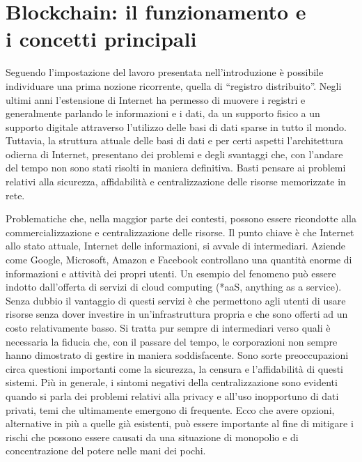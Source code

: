 \chapter{Blockchain: il funzionamento e\\ i concetti principali}
\label{ch:blockchain}

Seguendo l’impostazione del lavoro presentata nell’introduzione è possibile individuare una prima nozione ricorrente, quella di “registro distribuito”. Negli ultimi anni l’estensione di Internet ha permesso di muovere i registri e generalmente parlando le informazioni e i dati, da un supporto fisico a un supporto digitale attraverso l’utilizzo delle basi di dati sparse in tutto il mondo. Tuttavia, la struttura attuale delle basi di dati e per certi aspetti l’architettura odierna di Internet, presentano dei problemi e degli svantaggi che, con l’andare del tempo non sono stati risolti in maniera definitiva. Basti pensare ai problemi relativi alla sicurezza, affidabilità e centralizzazione delle risorse memorizzate in rete.

Problematiche che, nella maggior parte dei contesti, possono essere ricondotte alla commercializzazione e centralizzazione delle risorse. Il punto chiave è che Internet allo stato attuale, Internet delle informazioni, si avvale di intermediari. Aziende come Google, Microsoft, Amazon e Facebook controllano una quantità enorme di informazioni e attività dei propri utenti. Un esempio del fenomeno può essere indotto dall’offerta di servizi di cloud computing (*aaS, anything as a service). Senza dubbio il vantaggio di questi servizi è che permettono agli utenti di usare risorse senza dover investire in un’infrastruttura propria e che sono offerti ad un costo relativamente basso. Si tratta pur sempre di intermediari verso quali è necessaria la fiducia che, con il passare del tempo, le corporazioni non sempre hanno dimostrato di gestire in maniera soddisfacente. Sono sorte preoccupazioni circa questioni importanti come la sicurezza, la censura e l'affidabilità di questi sistemi. Più in generale, i sintomi negativi della centralizzazione sono evidenti quando si parla dei problemi relativi alla privacy e all'uso inopportuno di dati privati, temi che ultimamente emergono di frequente. Ecco che avere opzioni, alternative in più a quelle già esistenti, può essere importante al fine di mitigare i rischi che possono essere causati da una situazione di monopolio e di concentrazione del potere nelle mani dei pochi.

